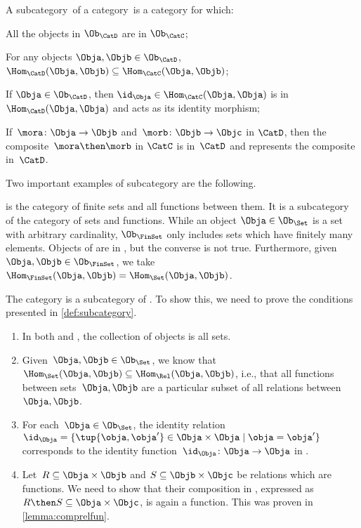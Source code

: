 \begin{ctdefinition}[Subcategory]
\label{def:subcategory}
A subcategory~\CatD of a category~\CatC is a category for which:
\begin{compactenum}
    \item All the objects in $\Ob_\CatD$ are in $\Ob_\CatC$;
    \item For any objects $\Obja,\Objb\in \Ob_\CatD$, $\Hom_\CatD(\Obja,\Objb)\subseteq \Hom_\CatC(\Obja,\Objb)$;
    \item If $\Obja\in \Ob_\CatD$, then $\id_\Obja \in \Hom_\CatC(\Obja,\Obja)$ is in $\Hom_\CatD(\Obja,\Obja)$ and acts as its identity morphism;
    \item If~$\mora \colon \Obja \to \Objb$ and~$\morb\colon \Objb\to \Objc$ in $\CatD$, then the composite~$\mora \then \morb$ in $\CatC$ is in~$\CatD$ and represents the composite in~$\CatD$.
\end{compactenum}
\end{ctdefinition}

Two important examples of subcategory are the following. 

\begin{example}
\FinSet is the category of finite sets and all functions between them. It is a subcategory of the category \Set of sets and functions. While an object $\Obja \in \Ob_\Set$ is a set with arbitrary cardinality, $\Ob_{\FinSet}$ only includes sets which have finitely many elements. Objects of \FinSet are in \Set, but the converse is not true. Furthermore, given $\Obja,\Objb\in \Ob_\FinSet$, we take $\Hom_{\FinSet}(\Obja,\Objb)=\Hom_{\Set}(\Obja,\Objb)$.
\end{example}


\begin{example}
    The category \Set is a subcategory of \Rel. To show this, we need to prove the conditions presented in \cref{def:subcategory}.
	\begin{enumerate}
	\item In both \Rel and \Set, the collection of objects is all sets.
	\item Given~$\Obja,\Objb\in \Ob_{\Set}$, we know that~$\Hom_{\Set}(\Obja,\Objb)\subseteq \Hom_{\Rel}(\Obja,\Objb)$, i.e., that all functions between sets~$\Obja,\Objb$ are a particular subset of all relations between~$\Obja,\Objb$.
	\item For each~$\Obja \in \Ob_{\Set}$, the identity relation~$\id_\Obja=\{\tup{\obja,\obja'}\in \Obja\times \Obja \mid \obja=\obja'\}$ corresponds to the identity function~$\id_\Obja \colon \Obja \to \Obja$ in \Set.
	\item Let~$R\subseteq \Obja\times \Objb$ and $S\subseteq \Objb \times \Objc$ be relations which are functions. We need to show that their composition in \Rel, expressed as~$R\then S\subseteq \Obja\times \Objc$, is again a function. This was proven in \cref{lemma:comprelfun}.
	\end{enumerate}

\end{example}



